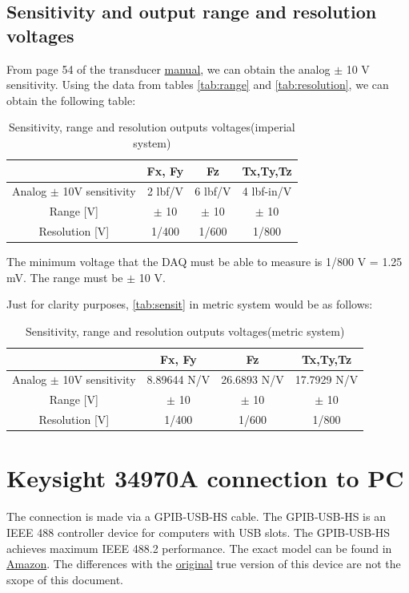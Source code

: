 \documentclass[a4paper]{article}
\begin{document}
\subsection{Sensitivity and output range and resolution voltages}

From page 54 of the transducer \href{https://www.ati-ia.com/app_content/documents/9620-05-Transducer%20Section.pdf}{manual}, we can obtain the analog $\pm$ 10 V sensitivity. Using the data from tables \ref{tab:range} and \ref{tab:resolution}, we can obtain the following table:

\begin{table}[h!]
	\centering
	\caption{Sensitivity, range and resolution outputs voltages\label{tab:sensit} (imperial system)}
	\begin{tabular}{||c | c | c | c ||} 
		\hline
		 & Fx, Fy & Fz & Tx,Ty,Tz \\ [0.5ex] 
		\hline\hline
		Analog $\pm$ 10V sensitivity & 2 lbf/V & 6 lbf/V & 4 lbf-in/V\\ 
		\hline
		Range [V] & $\pm$ 10 & $\pm$ 10 & $\pm$ 10 \\
		\hline
		Resolution [V] & 1/400 & 1/600 & 1/800 \\
		\hline
	\end{tabular}
\end{table}

The minimum voltage that the DAQ must be able to measure is 1/800 V = 1.25 mV. The range must be $\pm$ 10 V.

Just for clarity purposes, \autoref{tab:sensit} in metric system would be as follows:

\begin{table}[h!]
	\centering
	\caption{Sensitivity, range and resolution outputs voltages\label{tab:sensit2} (metric system)}
	\begin{tabular}{||c | c | c | c ||} 
		\hline
		& Fx, Fy & Fz & Tx,Ty,Tz \\ [0.5ex] 
		\hline\hline
		Analog $\pm$ 10V sensitivity & 8.89644 N/V & 26.6893 N/V & 17.7929 N/V\\ 
		\hline
		Range [V] & $\pm$ 10 & $\pm$ 10 & $\pm$ 10 \\
		\hline
		Resolution [V] & 1/400 & 1/600 & 1/800 \\
		\hline
	\end{tabular}
\end{table}


\section{Keysight 34970A connection to PC}
The connection is made via a GPIB‑USB‑HS cable. The GPIB‑USB‑HS is an IEEE 488 controller device for computers with USB slots. The GPIB‑USB‑HS achieves maximum IEEE 488.2 performance. The exact model can be found in \hyperref{https://www.amazon.com/Kanonaki-GPIB-USB-HS-Interface-Adapter-Controller/dp/B07Q84XJJF}{category}{name}{Amazon}. The differences with the \hyperref{https://www.newark.com/ni/780570-01/gpib-usb-hs-gpib-control-device/dp/14AJ5119}{category}{name}{original} true version of this device are not the sxope of this document. 
\end{document}
